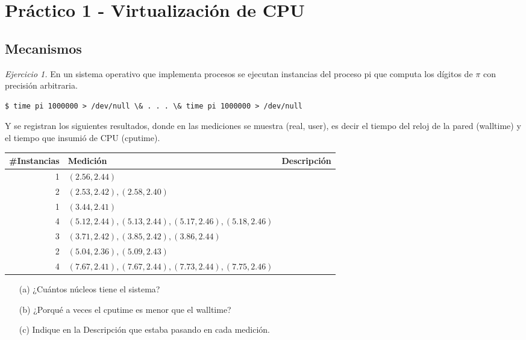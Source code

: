 \documentclass[12pt]{article}
\begin{document}
\section*{Práctico 1 - Virtualización de CPU}
\subsection*{Mecanismos}
\noindent \textit{Ejercicio 1.} En un sistema operativo que implementa procesos se ejecutan instancias del proceso pi que computa los dígitos de $\pi$ con precisión arbitraria.\\
\begin{lstlisting}[style=BashStyle]
    $ time pi 1000000 > /dev/null \& . . . \& time pi 1000000 > /dev/null
\end{lstlisting}
Y se registran los siguientes resultados, donde en las mediciones se muestra (real, user), es decir el tiempo del reloj de la pared (walltime) y el tiempo que insumió de CPU (cputime).

\begin{center}
\begin{tabular}{r|l|l}
\#Instancias & Medición & Descripción \\
\hline
1 & $(2.56,2.44)$ &  \\
2 & $(2.53,2.42),(2.58,2.40)$ &  \\
1 & $(3.44,2.41)$ &  \\
4 & $(5.12,2.44),(5.13,2.44),(5.17,2.46),(5.18,2.46)$ &  \\
3 & $(3.71,2.42),(3.85,2.42),(3.86,2.44)$ &  \\
2 & $(5.04,2.36),(5.09,2.43)$ &  \\
4 & $(7.67,2.41),(7.67,2.44),(7.73,2.44),(7.75,2.46)$ &  \\
\end{tabular}
\end{center}

\begin{itemize}
    \item[(a)] ¿Cuántos núcleos tiene el sistema?
    \item[(b)] ¿Porqué a veces el cputime es menor que el walltime?
    \item[(c)] Indique en la Descripción que estaba pasando en cada medición.
\end{itemize}
\end{document}
